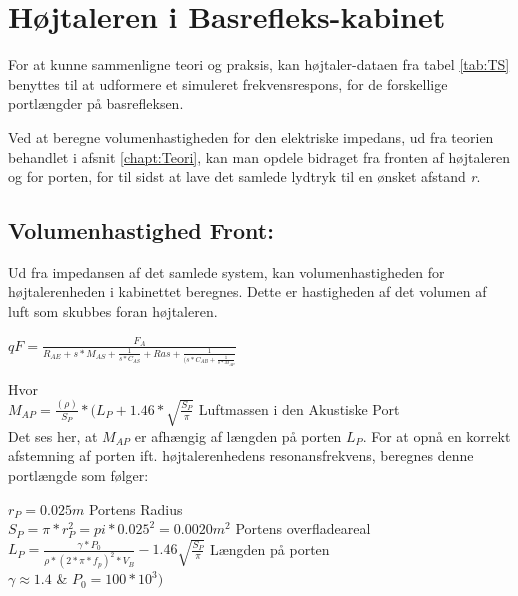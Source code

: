 \section{Højtaleren i Basrefleks-kabinet}

For at kunne sammenligne teori og praksis, kan højtaler-dataen fra tabel \ref{tab:TS} benyttes til at udformere et simuleret frekvensrespons, for de forskellige portlængder på basrefleksen.

Ved at beregne volumenhastigheden for den elektriske impedans, ud fra teorien behandlet i afsnit \ref{chapt:Teori}, kan man opdele bidraget fra fronten af højtaleren og for porten, for til sidst at lave det samlede lydtryk til en ønsket afstand \textit{r}. 


\subsection{Volumenhastighed Front:}
\label{sec:sim_calc}

Ud fra impedansen af det samlede system, kan volumenhastigheden for højtalerenheden i kabinettet beregnes. Dette er hastigheden af det volumen af luft som skubbes foran højtaleren. 

{\large\(qF=\)}{\Large \(\frac{F_A}{R_{AE}+s*M_{AS}+\frac{1}{s*C_{AS}}+Ras+\frac{1}{(s*C_{AB}+\frac{1}{s*M_{AP}}}}\) }

Hvor\\

\(M_{AP}=\frac{(\rho)}{S_P}*(L_P+1.46*\sqrt{\frac{S_P}{\pi}}\)  \hspace{3.1 cm} Luftmassen i den Akustiske Port\\

Det ses her, at $M_{AP}$ er afhængig af længden på porten $L_P$. For at opnå en korrekt afstemning af porten ift. højtalerenhedens resonansfrekvens, beregnes denne portlængde som følger:

\(r_P=0.025 m\)		\hspace{6.2cm} Portens Radius\\
\(S_P=\pi*r_P^2=pi*0.025^2=0.0020 m^2\)		\hspace{2cm} Portens overfladeareal\\
\(L_P=\frac{\gamma*P_0}{\rho*(2*\pi*f_p)^2*V_{B}}-1.46\sqrt{\frac{S_P}{\pi}}\)			\hspace{3cm} Længden på porten\\

$\gamma \approx 1.4$ \& $P_0=100*10^3)$\\

